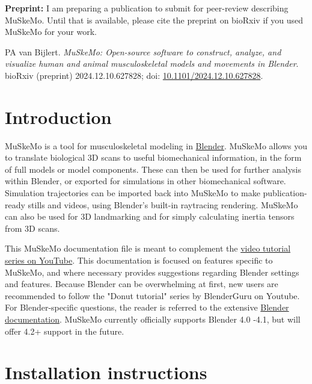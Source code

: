 \documentclass{article}
\begin{document}
\vspace{20pt} %
\noindent
\textbf{Preprint:} I am preparing a publication to submit for peer-review describing MuSkeMo. Until that is available, please cite the preprint on bioRxiv if you used MuSkeMo for your work.

\noindent
PA van Bijlert. \textit{MuSkeMo: Open-source software to construct, analyze, and visualize human and animal musculoskeletal models and movements in Blender}. bioRxiv (preprint) 2024.12.10.627828; doi: \href{https://doi.org/10.1101/2024.12.10.627828}{10.1101/2024.12.10.627828}.

\vfill  %

\newpage  %


\tableofcontents

\newpage
\section{Introduction}

MuSkeMo is a tool for musculoskeletal modeling in \href{https://www.blender.org}{Blender}. MuSkeMo allows you to translate biological 3D scans to useful biomechanical information, in the form of full models or model components. These can then be used for further analysis within Blender, or exported for simulations in other biomechanical software. Simulation trajectories can be imported back into MuSkeMo to make publication-ready stills and videos, using Blender’s built-in raytracing rendering. MuSkeMo can also be used for 3D landmarking and for simply calculating inertia tensors from 3D scans.

This MuSkeMo documentation file is meant to complement the \href{https://www.youtube.com/watch?v=9eMm9YalXtg&list=PLfgxaucAWlEp5-cavvXmdrTIWYT_tgZYK&pp=gAQBiAQB}{video tutorial series on YouTube}.
This documentation is focused on features specific to MuSkeMo, and where necessary provides suggestions regarding Blender settings and features. Because Blender can be overwhelming at first, new users are recommended to follow the "Donut tutorial" series by BlenderGuru on Youtube. For Blender-specific questions, the reader is referred to the extensive \href{https://docs.blender.org/}{Blender documentation}. MuSkeMo currently officially supports Blender 4.0 -4.1, but will offer 4.2+ support in the future. 

\section{Installation instructions}
\end{document}
